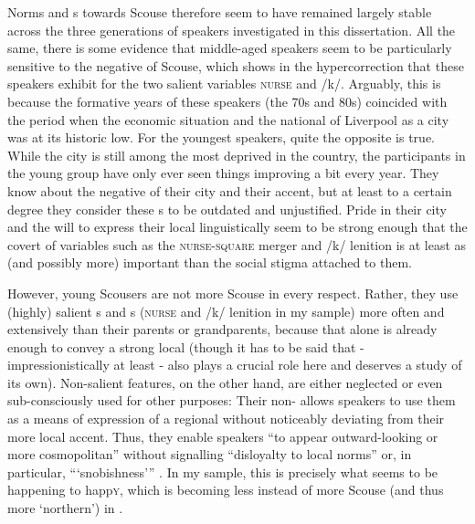 Norms and s towards Scouse therefore seem to have remained largely stable across the three generations of speakers investigated in this dissertation.
All the same, there is some evidence that middle-aged speakers seem to be particularly sensitive to the negative  of Scouse, which shows in the hypercorrection that these speakers exhibit for the two salient variables \textsc{nurse} and /k/.
Arguably, this is because the formative years of these speakers (the 70s and 80s) coincided with the period when the economic situation and the national  of Liverpool as a city was at its historic low.
For the youngest speakers, quite the opposite is true.
While the city is still among the most deprived in the country, the participants in the young group have only ever seen things improving a bit every year.
They know about the negative  of their city and their accent, but at least to a certain degree they consider these s to be outdated and unjustified.
Pride in their city and the will to express their local  linguistically seem to be strong enough that the covert  of variables such as the \textsc{nurse}-\textsc{square} merger and /k/ lenition is at least as (and possibly more) important than the social stigma attached to them.

However, young Scousers are not more Scouse in every respect.
Rather, they use (highly) salient s and s (\textsc{nurse} and /k/ lenition in my sample) more often and extensively than their parents or grandparents, because that alone is already enough to convey a strong local  (though it has to be said that  - impressionistically at least - also plays a crucial role here and deserves a study of its own).
Non-salient features, on the other hand, are either neglected or even sub-consciously used for other purposes: Their non- allows speakers to use them as a means of expression of a regional  without noticeably deviating from their more local accent.
Thus, they enable speakers ``to appear outward-looking or more cosmopolitan'' without signalling ``disloyalty to local norms'' or, in particular, ``{}`snobishness'{}'' \parencite[13--14]{foulkesdocherty1999a}.
In my sample, this is precisely what seems to be happening to happ\textsc{y}, which is becoming less instead of more Scouse (and thus more `northern') in .

